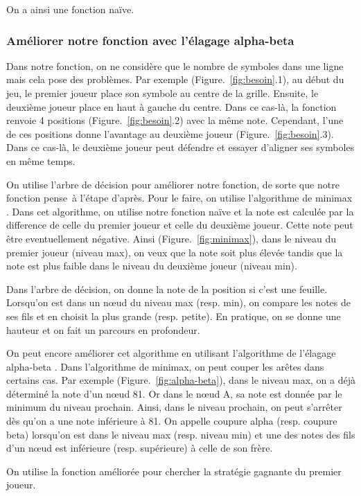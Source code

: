 \documentclass[12pt, a4paper]{article}
\begin{document}
On a ainsi une fonction naïve.

\subsubsection{Améliorer notre fonction avec l'élagage alpha-beta}
Dans notre fonction, on ne considère que le nombre de symboles dans une ligne mais cela pose des problèmes. Par exemple (\mbox{Figure. \ref{fig:besoin}.1}), au début du jeu, le premier joueur place son symbole au centre de la grille. Ensuite, le deuxième joueur place en haut à gauche du centre. Dans ce cas-là, la fonction renvoie 4 positions (\mbox{Figure. \ref{fig:besoin}.2}) avec la même note. Cependant, l'une de ces positions donne l'avantage au deuxième joueur (\mbox{Figure. \ref{fig:besoin}.3}). Dans ce cas-là, le deuxième joueur peut défendre et essayer d'aligner ses symboles en même temps. 
\par
On utilise l'arbre de décision pour améliorer notre fonction, de sorte que notre fonction \og pense\fg \ à l'étape d'après. Pour le faire, on utilise l'algorithme de minimax \cite{minimax}. Dans cet algorithme, on utilise notre fonction naïve et la note est calculée par la difference de celle du premier joueur et celle du deuxième joueur. Cette note peut être eventuellement négative. Ainsi (\mbox{Figure. \ref{fig:minimax}}), dans le niveau du premier joueur (niveau max), on veux que la note soit plus élevée tandis que la note est plus faible dans le niveau du deuxième joueur (niveau min).

Dans l'arbre de décision, on donne la note de la position si c'est une feuille. Lorsqu'on est dans un nœud du niveau max (resp. min), on compare les notes de ses fils et en choisit la plus grande (resp. petite). En pratique, on se donne une hauteur et on fait un parcours en profondeur.\par
On peut encore améliorer cet algorithme en utilisant l'algorithme de l'élagage alpha-beta \cite{alpha-beta}. Dans l'algorithme de minimax, on peut couper les arêtes dans certains cas. Par exemple (\mbox{Figure. \ref{fig:alpha-beta}}), dans le niveau max, on a déjà déterminé la note d'un nœud 81. Or dans le nœud A, sa note est donnée par le minimum du niveau prochain. Ainsi, dans le niveau prochain, on peut s'arrêter dès qu'on a une note inférieure à 81. On appelle coupure alpha (resp. coupure beta) lorsqu'on est dans le niveau max (resp. niveau min) et une des notes des fils d'un nœud est inférieure (resp. supérieure) à celle de son frère.\par
On utilise la fonction améliorée pour chercher la stratégie gagnante du premier joueur.
\end{document}
